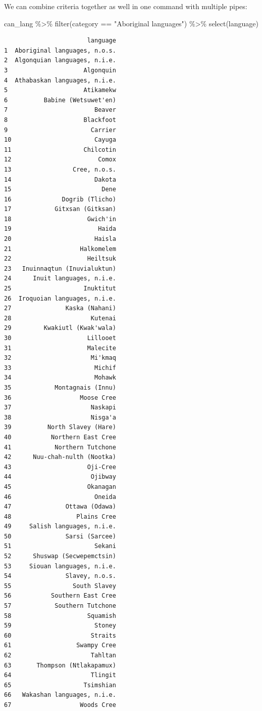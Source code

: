 \documentclass[
  letterpaper,
  DIV=11,
  numbers=noendperiod]{scrartcl}
\newenvironment{Shaded}{\begin{snugshade}}{\end{snugshade}}
\newcommand{\FunctionTok}[1]{\textcolor[rgb]{0.28,0.35,0.67}{#1}}
\newcommand{\NormalTok}[1]{\textcolor[rgb]{0.00,0.23,0.31}{#1}}
\newcommand{\SpecialCharTok}[1]{\textcolor[rgb]{0.37,0.37,0.37}{#1}}
\newcommand{\StringTok}[1]{\textcolor[rgb]{0.13,0.47,0.30}{#1}}
\begin{document}
We can combine criteria together as well in one command with multiple
pipes:

\begin{Shaded}
\begin{Highlighting}[]
\NormalTok{can\_lang }\SpecialCharTok{\%\textgreater{}\%} 
  \FunctionTok{filter}\NormalTok{(category }\SpecialCharTok{==} \StringTok{"Aboriginal languages"}\NormalTok{) }\SpecialCharTok{\%\textgreater{}\%} 
  \FunctionTok{select}\NormalTok{(language)}
\end{Highlighting}
\end{Shaded}

\begin{verbatim}
                       language
1  Aboriginal languages, n.o.s.
2  Algonquian languages, n.i.e.
3                     Algonquin
4  Athabaskan languages, n.i.e.
5                     Atikamekw
6          Babine (Wetsuwet'en)
7                        Beaver
8                     Blackfoot
9                       Carrier
10                       Cayuga
11                    Chilcotin
12                        Comox
13                 Cree, n.o.s.
14                       Dakota
15                         Dene
16              Dogrib (Tlicho)
17            Gitxsan (Gitksan)
18                     Gwich'in
19                        Haida
20                       Haisla
21                   Halkomelem
22                     Heiltsuk
23   Inuinnaqtun (Inuvialuktun)
24      Inuit languages, n.i.e.
25                    Inuktitut
26  Iroquoian languages, n.i.e.
27               Kaska (Nahani)
28                      Kutenai
29         Kwakiutl (Kwak'wala)
30                     Lillooet
31                     Malecite
32                      Mi'kmaq
33                       Michif
34                       Mohawk
35            Montagnais (Innu)
36                   Moose Cree
37                      Naskapi
38                      Nisga'a
39          North Slavey (Hare)
40           Northern East Cree
41            Northern Tutchone
42      Nuu-chah-nulth (Nootka)
43                     Oji-Cree
44                      Ojibway
45                     Okanagan
46                       Oneida
47               Ottawa (Odawa)
48                  Plains Cree
49     Salish languages, n.i.e.
50               Sarsi (Sarcee)
51                       Sekani
52      Shuswap (Secwepemctsin)
53     Siouan languages, n.i.e.
54               Slavey, n.o.s.
55                 South Slavey
56           Southern East Cree
57            Southern Tutchone
58                     Squamish
59                       Stoney
60                      Straits
61                  Swampy Cree
62                      Tahltan
63       Thompson (Ntlakapamux)
64                      Tlingit
65                    Tsimshian
66   Wakashan languages, n.i.e.
67                   Woods Cree
\end{verbatim}
\end{document}

